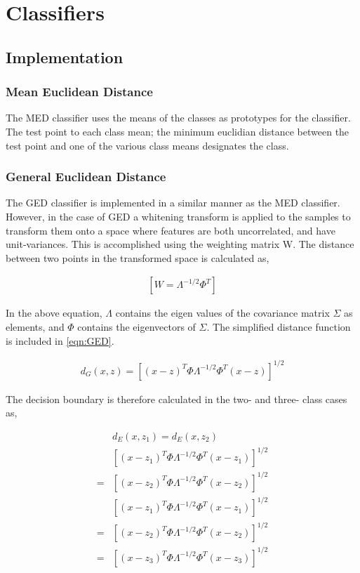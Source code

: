 \section{Classifiers}

\subsection{Implementation}

\subsubsection{Mean Euclidean Distance}

The MED classifier uses the means of the classes as prototypes for the classifier. The test point to each class mean; the minimum euclidian distance between the test point and one of the various class means designates the class.

\subsubsection{General Euclidean Distance}
The GED classifier is implemented in a similar manner as the MED classifier. However, in the case of GED a whitening transform is applied to the samples to transform them onto a space where features are both uncorrelated, and have unit-variances. This is accomplished using the weighting matrix W. The distance between two points in the transformed space is calculated as,


\begin{eqnarray}
\label{eqn:GED-whitening}
\left [ W=\Lambda^{-1/2}\Phi^{T}  \right ]
\end{eqnarray}



In the above equation, $\Lambda$ contains the eigen values of the covariance matrix $\Sigma$ as elements, and $\Phi$ contains the eigenvectors of $\Sigma$. The simplified distance function is included in \ref{eqn:GED}.

\begin{eqnarray}
\label{eqn:GED}
{d}_{G}(x,z) = {\left [ (x-z)^{T}\Phi\Lambda^{-1/2}\Phi^{T}(x-z) \right ]}^{1/2}
\end{eqnarray}


The decision boundary is therefore calculated in the two- and three- class cases as,

\begin{eqnarray}
\label{eqn:boundary-GED}
& d_{E} (x,z_{1}) = d_{E} (x,z_{2}) \\
& \left [ (x-{z}_{1})^{T}\Phi\Lambda^{-1/2}\Phi^{T}(x-z_{1}) \right ]^{1/2} \\
= & \left [ (x-z_{2})^{T}\Phi\Lambda^{-1/2}\Phi^{T}(x-z_{2}) \right ]^{1/2}  \nonumber \\
&\left [ (x-{z}_{1})^{T}\Phi\Lambda^{-1/2}\Phi^{T}(x-z_{1}) \right ]^{1/2} \\
= &\left [ (x-z_{2})^{T}\Phi\Lambda^{-1/2}\Phi^{T}(x-z_{2}) \right ]^{1/2}  \nonumber \\
= &\left [ (x-z_{3})^{T}\Phi\Lambda^{-1/2}\Phi^{T}(x-z_{3}) \right ]^{1/2}  \nonumber
\end{eqnarray}



